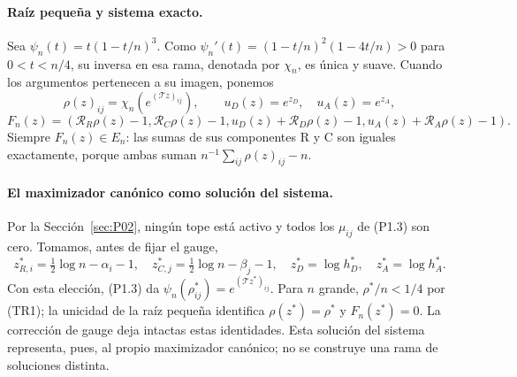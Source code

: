 \paragraph{Raíz pequeña y sistema exacto.}
Sea $\psi_n(t)=t(1-t/n)^3$. Como
$\psi_n'(t)=(1-t/n)^2(1-4t/n)>0$ para $0<t<n/4$,
su inversa en esa rama, denotada por $\chi_n$, es única y suave.
Cuando los argumentos pertenecen a su imagen, ponemos
\[
 \rho(z)_{ij}=\chi_n(e^{(\mathcal Tz)_{ij}}),\qquad
 u_D(z)=e^{z_D},\quad u_A(z)=e^{z_A},
\]
\[
 F_n(z)=(\mathcal R_R\rho(z)-1,\mathcal R_C\rho(z)-1,
 u_D(z)+\mathcal R_D\rho(z)-1,u_A(z)+\mathcal R_A\rho(z)-1).
                                                        \tag{TR5}
\]
Siempre $F_n(z)\in E_n$: las sumas de sus componentes R y C son
iguales exactamente, porque ambas suman $n^{-1}\sum_{ij}\rho(z)_{ij}-n$.

\paragraph{El maximizador canónico como solución del sistema.}
Por la Sección~\ref{sec:P02}, ningún tope está activo y todos los $\mu_{ij}$ de (P1.3) son cero.
Tomamos, antes de fijar el gauge,
\[
 z^*_{R,i}=\tfrac12\log n-\alpha_i-1,\quad
 z^*_{C,j}=\tfrac12\log n-\beta_j-1,\quad
 z_D^*=\log h_D^*,\quad z_A^*=\log h_A^*.
\]
Con esta elección, (P1.3) da $\psi_n(\rho^*_{ij})=e^{(\mathcal Tz^*)_{ij}}$.
Para $n$ grande, $\rho^*/n<1/4$ por (TR1); la unicidad de la raíz
pequeña identifica $\rho(z^*)=\rho^*$ y $F_n(z^*)=0$.
La corrección de gauge deja intactas estas identidades.
Esta solución del sistema representa, pues, al propio maximizador canónico; no se construye una
rama de soluciones distinta.

